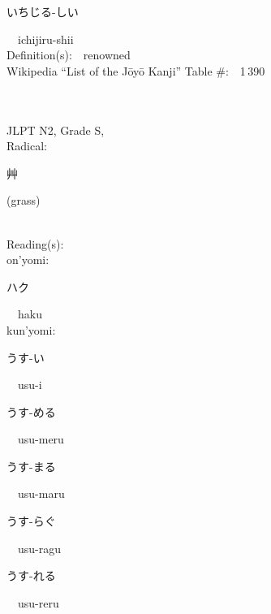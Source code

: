 \begin{multicols}{2}
{\hspace*{2em}}{\begin{CJK}{UTF8}{min} いちじる-しい \end{CJK}}\ \ ichijiru-shii\ \ \\
Definition(s):\ \ renowned \\
Wikipedia ``List of the J\=oy\=o Kanji'' Table \#:\ \ 1\,390 \\
\ \ \\
{\fontsize{34pt}{40pt}  }\ \ \\  %
{JLPT N2, Grade S, \\Radical:\ \ {\begin{CJK}{UTF8}{min} 艸 \end{CJK}} (grass) } \\
Reading(s):\ \ \\
{\hspace*{1em}}on'yomi:\ \ \\
{\hspace*{2em}}{\begin{CJK}{UTF8}{min} ハク \end{CJK}}\ \ haku\ \ \\
{\hspace*{1em}}kun'yomi:\ \ \\
{\hspace*{2em}}{\begin{CJK}{UTF8}{min} うす-い \end{CJK}}\ \ usu-i\ \ \\
{\hspace*{2em}}{\begin{CJK}{UTF8}{min} うす-める \end{CJK}}\ \ usu-meru\ \ \\
{\hspace*{2em}}{\begin{CJK}{UTF8}{min} うす-まる \end{CJK}}\ \ usu-maru\ \ \\
{\hspace*{2em}}{\begin{CJK}{UTF8}{min} うす-らぐ \end{CJK}}\ \ usu-ragu\ \ \\
{\hspace*{2em}}{\begin{CJK}{UTF8}{min} うす-れる \end{CJK}}\ \ usu-reru\ \ \\

\end{multicols}
